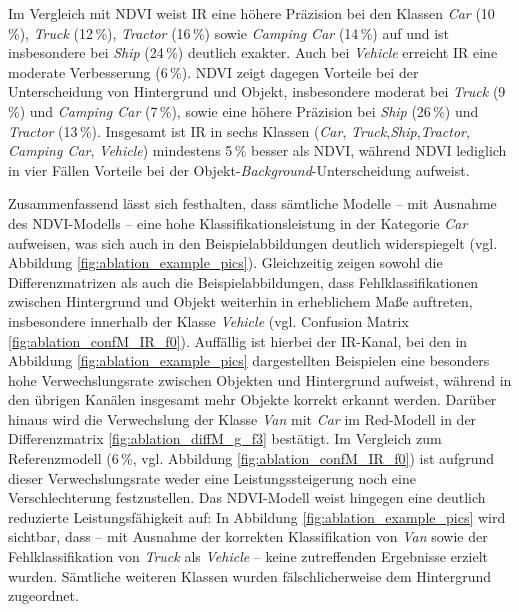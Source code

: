 Im Vergleich mit NDVI weist IR eine höhere Präzision bei den Klassen \textit{Car} (10\,\%), \textit{Truck} (12\,\%), \textit{Tractor} (16\,\%) sowie \textit{Camping Car} (14\,\%) auf und ist insbesondere bei \textit{Ship} (24\,\%) deutlich exakter. Auch bei \textit{Vehicle} erreicht IR eine moderate Verbesserung (6\,\%). NDVI zeigt dagegen Vorteile bei der Unterscheidung von Hintergrund und Objekt, insbesondere moderat bei \textit{Truck} (9\,\%) und \textit{Camping Car} (7\,\%), sowie eine höhere Präzision bei \textit{Ship} (26\,\%) und \textit{Tractor} (13\,\%). Insgesamt ist IR in sechs Klassen (\textit{Car}, \textit{Truck},\textit{Ship},\textit{Tractor}, \textit{Camping Car}, \textit{Vehicle}) mindestens 5\,\% besser als NDVI, während NDVI lediglich in vier Fällen Vorteile bei der Objekt-\textit{Background}-Unterscheidung aufweist.  

Zusammenfassend lässt sich festhalten, dass sämtliche Modelle – mit Ausnahme des NDVI-Modells – eine hohe Klassifikationsleistung in der Kategorie \textit{Car} aufweisen, was sich auch in den Beispielabbildungen deutlich widerspiegelt (vgl. Abbildung \ref{fig:ablation_example_pics}). Gleichzeitig zeigen sowohl die Differenzmatrizen als auch die Beispielabbildungen, dass Fehlklassifikationen zwischen Hintergrund und Objekt weiterhin in erheblichem Maße auftreten, insbesondere innerhalb der Klasse \textit{Vehicle} (vgl. Confusion Matrix \ref{fig:ablation_confM_IR_f0}). Auffällig ist hierbei der IR-Kanal, bei den in Abbildung \ref{fig:ablation_example_pics} dargestellten Beispielen eine besonders hohe Verwechslungsrate zwischen Objekten und Hintergrund aufweist, während in den übrigen Kanälen insgesamt mehr Objekte korrekt erkannt werden. Darüber hinaus wird die Verwechslung der Klasse \textit{Van} mit \textit{Car} im Red-Modell in der Differenzmatrix \ref{fig:ablation_diffM_g_f3} bestätigt. Im Vergleich zum Referenzmodell (6\,\%, vgl. Abbildung \ref{fig:ablation_confM_IR_f0}) ist aufgrund dieser Verwechslungsrate weder eine Leistungssteigerung noch eine Verschlechterung festzustellen. Das NDVI-Modell weist hingegen eine deutlich reduzierte Leistungsfähigkeit auf: In Abbildung \ref{fig:ablation_example_pics} wird sichtbar, dass – mit Ausnahme der korrekten Klassifikation von \textit{Van} sowie der Fehlklassifikation von \textit{Truck} als \textit{Vehicle} – keine zutreffenden Ergebnisse erzielt wurden. Sämtliche weiteren Klassen wurden fälschlicherweise dem Hintergrund zugeordnet.




